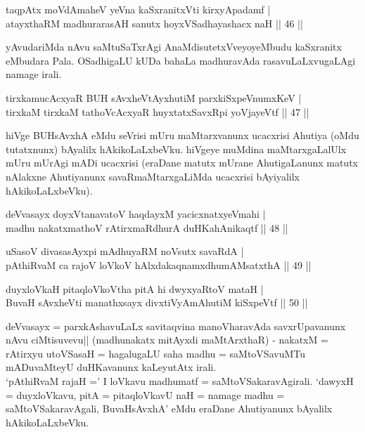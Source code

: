 
\begin{shl}
taqpAtx moVdAmaheV yeVna kaSxranitxVti kirxyApadamf | \\
atayxthaRM madhurarasAH sanutx hoyxVSadhayashacx naH \hfill|| 46 || 
\end{shl}

\begin{artha}
yAvudariMda nAvu saMtuSaTxrAgi AnaMdisutetxVveyoyeMbudu kaSxranitx 
eMbudara Pala. OSadhigaLU kUDa bahaLa madhuravAda rasavuLaLxvugaLAgi 
namage irali.
\end{artha}

\begin{shl}
tirxkamucAcxyaR BUH sAvxheVtAyxhutiM parxkiSxpeVnumxKeV | \\
tirxkaM tirxkaM tathoVcAcxyaR huyxtatxSavxRpi yoVjayeVtf \hfill|| 47 || 
\end{shl}

\begin{artha}
hiVge BUHsAvxhA eMdu seVrisi mUru maMtarxvanunx ucacxrisi Ahutiya 
(oMdu tutatxnunx) bAyalilx hAkikoLaLxbeVku. hiVgeye muMdina 
maMtarxgaLalUlx mUru mUrAgi mADi ucacxrisi (eraDane matutx mUrane 
AhutigaLanunx matutx nAlakxne Ahutiyanunx savaRmaMtarxgaLiMda 
ucacxrisi bAyiyalilx hAkikoLaLxbeVku).
\end{artha}


\begin{shl}
deVvasayx doyxVtanavatoV haqdayxM yacicxnatxyeVmahi | \\
madhu nakatxmathoV rAtirxmaRdhurA duHKahAnikaqtf \hfill|| 48 || 
\end{shl}

\begin{shl}
uSasoV divasasAyxpi mAdhuyaRM noV\s sutx savaRdA | \\
pAthiRvaM ca rajoV loVkoV hAlxdakaqnamxdhumAMsatxthA \hfill|| 49 || 
\end{shl}

\begin{shl}
duyxloVkaH pitaqloVkoV\s tha pitA hi dwyxyaRtoV mataH | \\
BuvaH sAvxheVti manathxsayx divxtiVyAmAhutiM kiSxpeVtf \hfill|| 50 || 
\end{shl}

\begin{artha}
deVvasayx = parxkAshavuLaLx savitaqvina manoVharavAda savxrUpavanunx 
nAvu ciMtisuvevu|| (madhunakatx mitAyxdi maMtArxthaR) - nakatxM = 
rAtirxyu utoVSasaH = hagalugaLU saha madhu = saMtoVSavuMTu mADuvaMteyU 
duHKavanunx kaLeyutAtx irali.\\
`pAthiRvaM rajaH =' I loVkavu madhumatf = saMtoVSakaravAgirali. `dawyxH 
= duyxloVkavu, pitA = pitaqloVkavU naH = namage madhu = 
saMtoVSakaravAgali, BuvaHsAvxhA' eMdu eraDane Ahutiyanunx bAyalilx 
hAkikoLaLxbeVku.
\end{artha}

